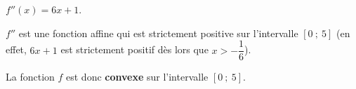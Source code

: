 \begin{corrige}
\begin{itemize}
          \par
          $f''(x)=6x+1$.
          \par
          $f''$ est une fonction affine qui est strictement positive sur l'intervalle $[0~;~5]$ (en effet, $6x+1$ est strictement positif dès lors que $x>-\dfrac{1}{6}$).
          \par
          La fonction $f$ est donc \textbf{convexe} sur l'intervalle $[0~;~5]$.
          \par
     \end{itemize}
\end{corrige}
